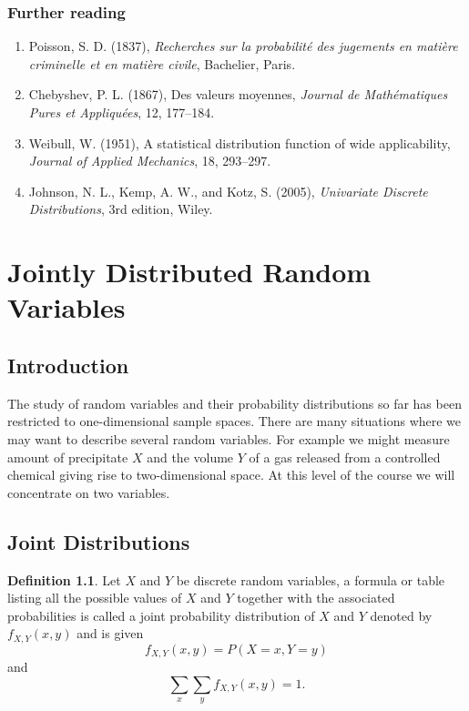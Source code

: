 \documentclass[12pt,a4paper]{report}
\theoremstyle{definition}
\newtheorem{definition}[thm]{Definition}
\theoremstyle{plain}
\theoremstyle{definition}
\begin{document}
\subsection*{Further reading}
\begin{enumerate}
\item Poisson, S. D. (1837), \emph{Recherches sur la probabilit\'e des jugements en
mati\`ere criminelle et en mati\`ere civile}, Bachelier, Paris.
\item Chebyshev, P. L. (1867), Des valeurs moyennes, \emph{Journal de Math\'ematiques
Pures et Appliqu\'ees}, 12, 177--184.
\item Weibull, W. (1951), A statistical distribution function of wide applicability,
\emph{Journal of Applied Mechanics}, 18, 293--297.
\item Johnson, N. L., Kemp, A. W., and Kotz, S. (2005), \emph{Univariate Discrete
Distributions}, 3rd edition, Wiley.
\end{enumerate}

\chapter{Jointly Distributed Random Variables}
\section{Introduction}
\vspace{-16pt}
The study of random variables and their probability distributions so far has been restricted to one-dimensional sample spaces. There are many situations where we may want to describe  several random variables. For example we might measure amount of precipitate $X$ and the volume $Y$ of a gas released from a controlled chemical giving rise to two-dimensional space. At this level of the course we will concentrate on two variables.



\section{Joint Distributions}
\vspace{-14pt}
\begin{definition}
Let $X$ and $Y$ be discrete random variables, a formula or table listing all the possible values of $X$ and $Y$ together with the associated probabilities is called a joint probability distribution of $X$ and $Y$ denoted by $f_{X,Y}(x,y)$ and is given \[f_{X,Y}(x,y)=P(X=x, Y=y)\] and \[\sum_x\sum_yf_{X,Y}(x,y)=1 .\]
\end{definition}
\end{document}
